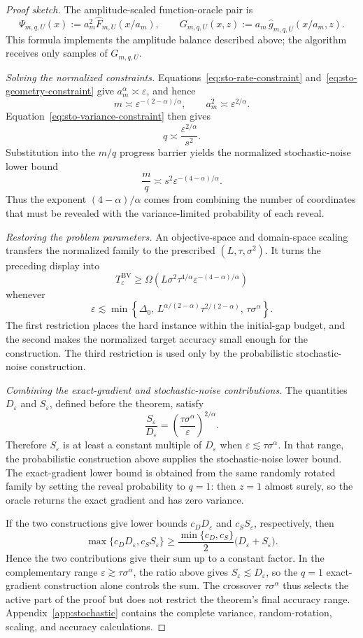 \documentclass[11pt]{article}
\begin{document}
\begin{proof}[Proof sketch]
The amplitude-scaled function-oracle pair is
\[
\Psi_{m,q,U}(x)
:=
a_m^2\widehat F_{m,U}(x/a_m),
\qquad
G_{m,q,U}(x,z)
:=
a_m\,\widehat g_{m,q,U}(x/a_m,z).
\]
This formula implements the amplitude balance described above; the algorithm receives only samples of
\(G_{m,q,U}\).

\emph{Solving the normalized constraints.}
Equations~\eqref{eq:sto-rate-constraint} and~\eqref{eq:sto-geometry-constraint} give
\(a_m^\alpha\asymp\varepsilon\), and hence
\[
m\asymp\varepsilon^{-(2-\alpha)/\alpha},
\qquad
a_m^2\asymp\varepsilon^{2/\alpha}.
\]
Equation~\eqref{eq:sto-variance-constraint} then gives
\[
q\asymp\frac{\varepsilon^{2/\alpha}}{s^2}.
\]
Substitution into the \(m/q\) progress barrier yields the normalized stochastic-noise lower bound
\[
\frac{m}{q}
\asymp
s^2\varepsilon^{-(4-\alpha)/\alpha}.
\]
Thus the exponent \((4-\alpha)/\alpha\) comes from combining the number of coordinates that must be revealed with the
variance-limited probability of each reveal.

\emph{Restoring the problem parameters.}
An objective-space and domain-space scaling transfers the normalized family to the prescribed
\((L,\tau,\sigma^2)\). It turns the preceding display into
\[
T_\varepsilon^{\mathrm{BV}}
\ge
\Omega\left(
L\sigma^2\tau^{4/\alpha}\varepsilon^{-(4-\alpha)/\alpha}
\right)
\]
whenever
\[
\varepsilon
\lesssim
\min\left\{
\Delta_0,\,
L^{\alpha/(2-\alpha)}\tau^{2/(2-\alpha)},\,
\tau\sigma^\alpha
\right\}.
\]
The first restriction places the hard instance within the initial-gap budget, and the second makes the normalized
target accuracy small enough for the construction. The third restriction is used only by the probabilistic
stochastic-noise construction.

\emph{Combining the exact-gradient and stochastic-noise contributions.}
The quantities \(D_\varepsilon\) and \(S_\varepsilon\), defined before the theorem, satisfy
\[
\frac{S_\varepsilon}{D_\varepsilon}
=
\left(\frac{\tau\sigma^\alpha}{\varepsilon}\right)^{2/\alpha}.
\]
Therefore \(S_\varepsilon\) is at least a constant multiple of \(D_\varepsilon\) when
\(\varepsilon\lesssim\tau\sigma^\alpha\). In that range, the probabilistic construction above supplies the
stochastic-noise lower bound. The exact-gradient lower bound is obtained from the same randomly rotated family by
setting the reveal probability to \(q=1\): then \(z=1\) almost surely, so the oracle returns the exact gradient and has
zero variance.

If the two constructions give lower bounds \(c_DD_\varepsilon\) and \(c_SS_\varepsilon\), respectively, then
\[
\max\{c_DD_\varepsilon,c_SS_\varepsilon\}
\ge
\frac{\min\{c_D,c_S\}}{2}
\bigl(D_\varepsilon+S_\varepsilon\bigr).
\]
Hence the two contributions give their sum up to a constant factor. In the complementary range
\(\varepsilon\gtrsim\tau\sigma^\alpha\), the ratio above gives \(S_\varepsilon\lesssim D_\varepsilon\), so the
\(q=1\) exact-gradient construction alone controls the sum. The crossover \(\tau\sigma^\alpha\) thus selects the active
part of the proof but does not restrict the theorem's final accuracy range. Appendix~\ref{app:stochastic} contains the
complete variance, random-rotation, scaling, and accuracy calculations.
\end{proof}
\end{document}
